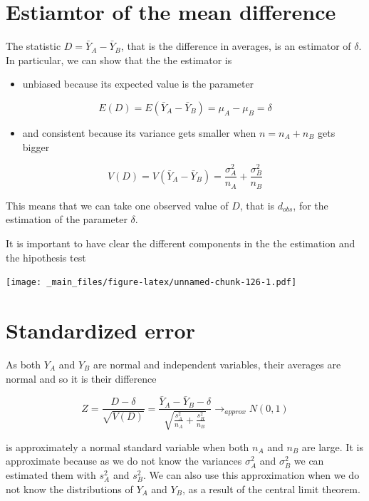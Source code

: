 \documentclass[
]{book}
\providecommand{\tightlist}{%
  \setlength{\itemsep}{0pt}\setlength{\parskip}{0pt}}
\begin{document}
\hypertarget{estiamtor-of-the-mean-difference}{%
\section{Estiamtor of the mean difference}\label{estiamtor-of-the-mean-difference}}

The statistic \(D=\bar{Y}_A-\bar{Y}_B\), that is the difference in averages, is an estimator of \(\delta\). In particular, we can show that the the estimator is

\begin{itemize}
\tightlist
\item
  unbiased because its expected value is the parameter
\end{itemize}

\[E(D)=E(\bar{Y}_A-\bar{Y}_B)=\mu_A-\mu_B=\delta\]

\begin{itemize}
\tightlist
\item
  and consistent because its variance gets smaller when \(n=n_A+n_B\) gets bigger
\end{itemize}

\[V(D)=V(\bar{Y}_A-\bar{Y}_B)=\frac{\sigma^2_A}{n_A}+\frac{\sigma^2_B}{n_B}\]

This means that we can take one observed value of \(D\), that is \(d_{obs}\), for the estimation of the parameter \(\delta\).

It is important to have clear the different components in the the estimation and the hipothesis test

\texttt{[image: \_main\_files/figure-latex/unnamed-chunk-126-1.pdf]}

\hypertarget{standardized-error}{%
\section{Standardized error}\label{standardized-error}}

As both \(Y_A\) and \(Y_B\) are normal and independent variables, their averages are normal and so it is their difference

\[Z=\frac{D-\delta}{\sqrt{V(D)}}=\frac{\bar{Y}_A-\bar{Y}_B -\delta}{\sqrt{\frac{s^2_A}{n_A}+\frac{s^2_B}{n_B}}} \rightarrow_{approx} N(0,1)\]

is approximately a normal standard variable when both \(n_A\) and \(n_B\) are large. It is approximate because as we do not know the variances \(\sigma^2_A\) and \(\sigma^2_B\) we can estimated them with \(s_A^2\) and \(s_B^2\). We can also use this approximation when we do not know the distributions of \(Y_A\) and \(Y_B\), as a result of the central limit theorem.
\end{document}

